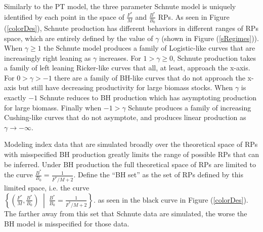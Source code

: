 %
Similarly to the PT model, the three parameter Schnute model is uniquely 
identified by each point in the space of $\frac{F^*}{M}$ 
and $\frac{B^*}{B_0}$ RPs. As seen in Figure (\ref{colorDes}), Schnute 
production has different behaviors in different ranges of RPs space, which 
are entirely defined by the value of $\gamma$ (shown in Figure (\ref{sRegimes})). 
When $\gamma\ge1$ the Schnute model produces a family of Logistic-like curves that are 
increasingly right leaning as $\gamma$ increases. 
For $1>\gamma\ge0$, Schnute production takes a family of left leaning Ricker-like curves 
that all, at least, approach the x-axis. For $0>\gamma>-1$ there are a family of BH-like 
curves that do not approach the x-axis but still have decreasing productivity for large
biomass stocks. When $\gamma$ is exactly $-1$ Schnute reduces to BH production which has 
asymptoting production for large biomass. Finally when $-1>\gamma$ Schnute 
produces a family of increasing Cushing-like curves that do not asymptote, and produces 
linear production as $\gamma\to-\infty$.

%
%
%

%
Modeling index data that are simulated broadly over the theoretical space of RPs 
with misspecified BH production greatly limits the range of possible RPs that 
can be inferred. Under BH production the full theoretical space of RPs are 
limited to the curve \mbox{$\frac{B^*}{B_0}=\frac{1}{F^*/M+2}$.} Define the 
``BH set'' as the set of RPs defined by this limited space, i.e. the curve \\
$\left\{\left(\frac{F^*}{M}, \frac{B^*}{B_0}\right) \;\middle|\; \frac{B^*}{B_0}=\frac{1}{F^*/M+2}\right\}$.
as seen in the black curve in Figure (\ref{colorDes}).
The farther away from this set that Schnute data are simulated, the worse the 
BH model is misspecified for those data. 


